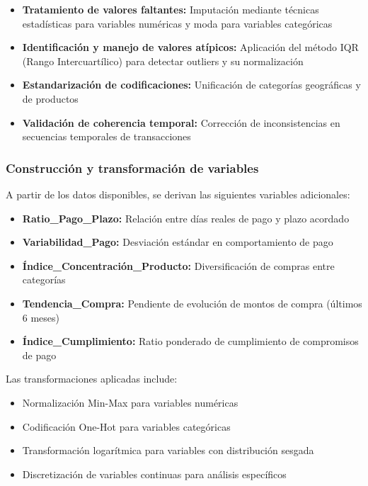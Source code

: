 \begin{itemize}
    \item \textbf{Tratamiento de valores faltantes:} Imputación mediante técnicas estadísticas para variables numéricas y moda para variables categóricas
    \item \textbf{Identificación y manejo de valores atípicos:} Aplicación del método IQR (Rango Intercuartílico) para detectar outliers y su normalización
    \item \textbf{Estandarización de codificaciones:} Unificación de categorías geográficas y de productos
    \item \textbf{Validación de coherencia temporal:} Corrección de inconsistencias en secuencias temporales de transacciones
\end{itemize}

\subsubsection{Construcción y transformación de variables}
A partir de los datos disponibles, se derivan las siguientes variables adicionales:

\begin{itemize}
    \item \textbf{Ratio\_Pago\_Plazo:} Relación entre días reales de pago y plazo acordado
    \item \textbf{Variabilidad\_Pago:} Desviación estándar en comportamiento de pago
    \item \textbf{Índice\_Concentración\_Producto:} Diversificación de compras entre categorías
    \item \textbf{Tendencia\_Compra:} Pendiente de evolución de montos de compra (últimos 6 meses)
    \item \textbf{Índice\_Cumplimiento:} Ratio ponderado de cumplimiento de compromisos de pago
\end{itemize}

Las transformaciones aplicadas include:

\begin{itemize}
    \item Normalización Min-Max para variables numéricas
    \item Codificación One-Hot para variables categóricas
    \item Transformación logarítmica para variables con distribución sesgada
    \item Discretización de variables continuas para análisis específicos
\end{itemize}

